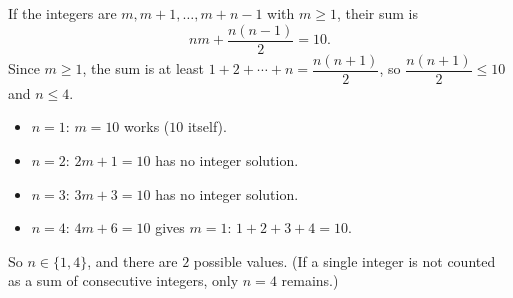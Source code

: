 If the integers are $m,m+1,\dots,m+n-1$ with $m\ge1$, their sum is
\[
nm+\dfrac{n(n-1)}{2}=10 .
\]
Since $m\ge1$, the sum is at least $1+2+\cdots+n=\dfrac{n(n+1)}{2}$, so $\dfrac{n(n+1)}{2}\le10$ and $n\le4$.
\begin{itemize}
\item $n=1$: $m=10$ works ($10$ itself).
\item $n=2$: $2m+1=10$ has no integer solution.
\item $n=3$: $3m+3=10$ has no integer solution.
\item $n=4$: $4m+6=10$ gives $m=1$: $1+2+3+4=10$.
\end{itemize}
So $n\in\{1,4\}$, and there are $\boxed{2}$ possible values. (If a single integer is not counted as a sum of consecutive integers, only $n=4$ remains.)
